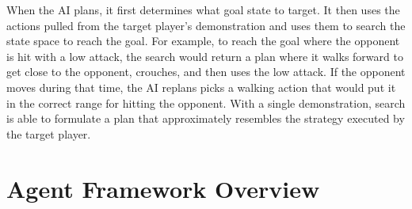 
When the AI plans, it first determines what goal state to target. It then uses the actions pulled from the target player's demonstration and uses them to search the state space to reach the goal. For example, to reach the goal where the opponent is hit with a low attack, the search would return a plan where it walks forward to get close to the opponent, crouches, and then uses the low attack. If the opponent moves during that time, the AI replans picks a walking action that would put it in the correct range for hitting the opponent. With a single demonstration, search is able to formulate a plan that approximately resembles the strategy executed by the target player.

\section{Agent Framework Overview}

